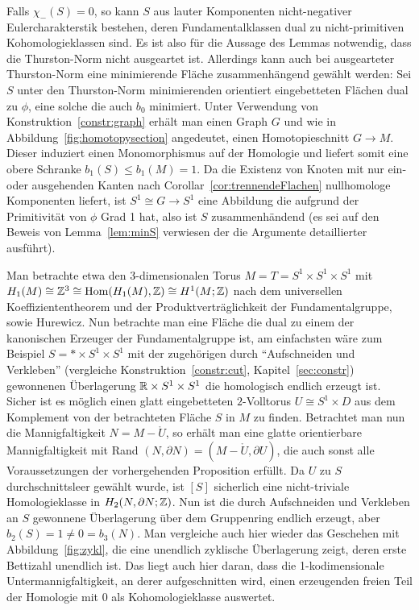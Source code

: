 \begin{bem}
    Falls $\chi_-(S)=0$, so kann $S$ aus lauter Komponenten nicht-negativer Eulercharakterstik bestehen, deren Fundamentalklassen dual zu nicht-primitiven Kohomologieklassen sind. Es ist also für die Aussage des Lemmas notwendig, dass die Thurston-Norm nicht ausgeartet ist. Allerdings kann auch bei ausgearteter Thurston-Norm eine minimierende Fläche zusammenhängend gewählt werden: Sei $S$ unter den Thurston-Norm minimierenden orientiert eingebetteten Flächen dual zu $\phi$, eine solche die auch $b_0$ minimiert. Unter Verwendung von Konstruktion~\ref{constr:graph} erhält man einen Graph $G$ und wie in Abbildung~\ref{fig:homotopysection} angedeutet, einen Homotopieschnitt $G\to M$. Dieser induziert einen Monomorphismus auf der Homologie und liefert somit eine obere Schranke $b_1(S)\leq b_1(M)=1$. Da die Existenz von Knoten mit nur ein- oder ausgehenden Kanten nach Corollar~\ref{cor:trennendeFlachen} nullhomologe Komponenten liefert, ist $S^1\cong G\to S^1$ eine Abbildung die aufgrund der Primitivität von $\phi$ Grad 1 hat, also ist $S$ zusammenhändend (es sei auf den Beweis von Lemma~\ref{lem:minS} verwiesen der die Argumente detaillierter ausführt).
\end{bem}

    \begin{bsp}
    \label{bsp:SohnerandMmit}
     Man betrachte etwa den 3-dimensionalen Torus $M=T=S^1\times S^1 \times S^1$ mit $H_1(M)\cong\mathbb{Z}^3 \cong \operatorname{Hom}(H_1(M),\mathbb{Z}) \cong H^1(M;\mathbb{Z})$ nach dem universellen Koeffiziententheorem und der Produktverträglichkeit der Fundamentalgruppe, sowie Hurewicz. Nun betrachte man eine Fläche die dual zu einem der kanonischen Erzeuger der Fundamentalgruppe ist, am einfachsten wäre zum Beispiel $S=* \times S^1 \times S^1$ mit der zugehörigen durch "`Aufschneiden und Verkleben"' (vergleiche Konstruktion~\ref{constr:cut}, Kapitel~\ref{sec:constr}) gewonnenen Überlagerung $\mathbb{R} \times S^1 \times S^1$ die homologisch endlich erzeugt ist. Sicher ist es möglich einen glatt eingebetteten $2$-Volltorus $U\cong S^1\times D$ aus dem Komplement von der betrachteten Fläche $S$ in $M$ zu finden. Betrachtet man nun die Mannigfaltigkeit $N=M - \mathring U$, so erhält man eine glatte orientierbare Mannigfaltigkeit mit Rand $(N,\partial N)= (M- \mathring U, \partial U)$, die auch sonst alle Voraussetzungen der vorhergehenden Proposition erfüllt. Da $U$ zu $S$ durchschnittsleer gewählt wurde, ist $[S]$ sicherlich eine nicht-triviale Homologieklasse in $H_2(N,\partial N;\mathbb{Z})$. Nun ist die durch Aufschneiden und Verkleben an $S$ gewonnene Überlagerung über dem Gruppenring endlich erzeugt, aber $b_2(S)=1 \neq 0 = b_3(N)$. Man vergleiche auch hier wieder das Geschehen mit Abbildung~\ref{fig:zykl}, die eine unendlich zyklische Überlagerung zeigt, deren erste Bettizahl unendlich ist. Das liegt auch hier daran, dass die 1-kodimensionale Untermannigfaltigkeit, an derer aufgeschnitten wird, einen erzeugenden freien Teil der Homologie mit 0 als Kohomologieklasse auswertet.
    
    \end{bsp}

